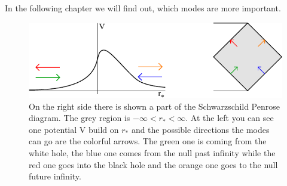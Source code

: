 	In the following chapter we will find out, which modes are more important.  
	\begin{figure} [tbp]
		\begin{center}
			\includegraphics[scale=1.6]{schscat}
			\caption{On the right side there is shown a part of the Schwarzschild Penrose diagram. The grey region is $-\infty < r_* <\infty$. At the left you can see one potential V build on $r_*$ and the possible directions the modes can go are the colorful arrows. The {\color{forestgreen} green} one is coming from the white hole, the {\color{blue} blue} one comes from the null past infinity while the {\color{red} red} one goes into the black hole and the {\color{orange} orange} one goes to the null future infinity.} \label{scattering}
		\end{center}
	\end{figure}